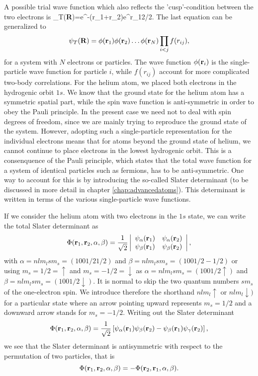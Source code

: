 A possible trial wave function which also reflects the 'cusp'-condition
between the two electrons is 
\be
   \psi_T({\bf R})=e^{-\alpha(r_1+r_2)}e^{r_{12}/2}.
    \label{eq:wavehelium2}
\ee
The last equation can be generalized to
\[
   \psi_T({\bf R})=\phi({\bf r}_1)\phi({\bf r}_2)\dots\phi({\bf r}_N)
                   \prod_{i< j}f(r_{ij}),
\]
for a system with $N$ electrons or particles. The wave function 
$\phi({\bf r}_i)$ is the single-particle wave function for particle $i$,
while $f(r_{ij})$ account for more complicated two-body correlations.
For the helium atom, we placed both electrons in the hydrogenic orbit
$1s$. We know that the ground state for the helium atom has a symmetric
spatial part, while the spin wave function is anti-symmetric in order
to obey the Pauli principle. In the present case we need not to deal with 
spin degrees of freedom, since we are mainly trying to reproduce the 
ground state of the system. However, adopting such a single-particle
representation for the individual electrons means that for atoms beyond
the ground state of helium, we cannot continue to place electrons in the lowest
hydrogenic orbit. This is a consenquence of the Pauli principle,
which states that the total wave function for a system of identical particles 
such as fermions, has to be anti-symmetric. One way to account for this is by introducing
the so-called Slater determinant (to be discussed in more detail in chapter \ref{chap:advancedatoms}).
This determinant is written in terms of the various single-particle wave functions.

If we consider the helium atom with two electrons in the $1s$ state, we can write the total Slater determinant as 
\[
   \Phi({\bf r}_1,{\bf r}_2,\alpha,\beta)=\frac{1}{\sqrt{2}}
\left| \begin{array}{cc} \psi_{\alpha}({\bf r}_1)& \psi_{\alpha}({\bf r}_2)\\\psi_{\beta}({\bf r}_1)&\psi_{\beta}({\bf r}_2)\end{array} \right|,
\] 
with $\alpha=nlm_lsm_s=(1001/21/2)$ and $\beta=nlm_lsm_s=(1001/2-1/2)$  or using $m_s=1/2=\uparrow$ and $m_s=-1/2=\downarrow$ as 
$\alpha=nlm_lsm_s=(1001/2\uparrow)$ and $\beta=nlm_lsm_s=(1001/2\downarrow)$.
It is normal to skip the two quantum numbers $sm_s$ 
of the one-electron spin. We introduce therefore the shorthand
 $nlm_l\uparrow$ or $nlm_l\downarrow)$ for a particular state where an arrow pointing upward represents
$m_s=1/2$ and a downward arrow stands for $m_s=-1/2$.
Writing out the Slater determinant
\[
\Phi({\bf r}_1,{\bf r}_2,\alpha,\beta)=
\frac{1}{\sqrt{2}}\left[
\psi_{\alpha}({\bf r}_1)\psi_{\beta}({\bf r}_2)-
\psi_{\beta}({\bf r}_1)\psi_{\gamma}({\bf r}_2)\right],
\]
we see that the Slater determinant is antisymmetric 
with respect to the permutation of two particles, that is
\[
\Phi({\bf r}_1,{\bf r}_2,\alpha,\beta)=-\Phi({\bf r}_2,{\bf r}_1,\alpha,\beta).
\]

